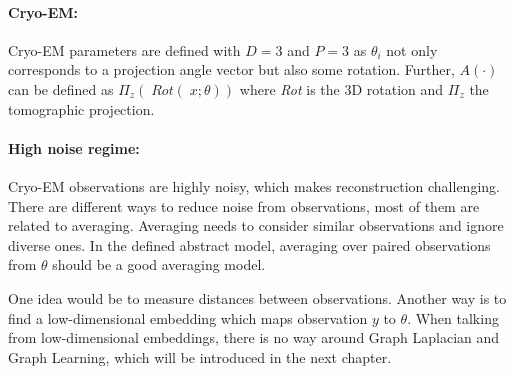 \paragraph{Cryo-EM:}
Cryo-EM parameters are defined with $D=3$ and $P=3$ as $\theta_i$ not only corresponds to
a projection angle vector but also some rotation.
Further, $A(\cdot)$ can be defined as $\Pi_z \left(\; \textit{Rot}(\;x; \theta) \right)$ 
where \textit{Rot} is the 3D rotation and $\Pi_z$ the tomographic projection.


\paragraph{High noise regime:}
Cryo-EM observations are highly noisy, which makes reconstruction challenging. 
There are different ways to reduce noise from observations, most of them are related to averaging. 
Averaging needs to consider similar observations and ignore diverse ones. 
In the defined abstract model, averaging over paired observations from $\theta$ should be a good averaging model.

One idea would be to measure distances between observations.
Another way is to find a low-dimensional embedding which maps observation $y$ to $\theta$.
When talking from low-dimensional embeddings, there is no way around Graph Laplacian and Graph Learning,
which will be introduced in the next chapter.
